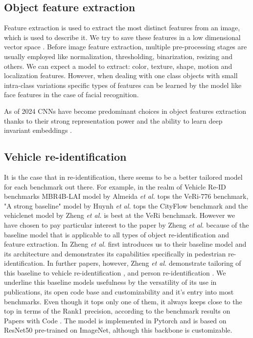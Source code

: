 \documentclass[conference]{IEEEtran} %
\begin{document}
	\subsection{Object feature extraction}
	
		Feature extraction is used to extract the most distinct features from an image, which is used to describe it. We try to save these features in a low dimensional vector space \cite{salau2019feature}. Before image feature extraction, multiple pre-processing stages are usually employed like normalization, thresholding, binarization, resizing and others. We can expect a model to extract: color, texture, shape, motion and localization features. However, when dealing with one class objects with small intra-class variations specific types of features can be learned by the model like face features in the case of facial recognition.
		
		As of 2024 CNNs have become predominant choices in object features extraction thanks to their strong representation power and the ability to learn deep invariant embeddings \cite{zheng2019joint}.
	
	\subsection{Vehicle re-identification}
	
		It is the case that in re-identification, there seems to be a better tailored model for each benchmark out there. For example, in the realm of Vehicle Re-ID benchmarks MBR4B-LAI model by Almeida \textit{et al.} \cite{almeida2023strength} tops the VeRi-776 benchmark, "A strong baseline" model by Huynh \textit{et al.} \cite{huynh2021strong} tops the CityFlow benchmark and the vehiclenet model by Zheng \textit{et al.} \cite{zheng2019vehiclenet} is best at the VeRi benchmark. However we have chosen to pay particular interest to the paper by Zheng \textit{et al.} because of the baseline model that is applicable to all types of object re-identification and feature extraction. In \cite{zheng2017discriminatively} Zheng \textit{et al.} first introduces us to their baseline model and its architecture and demonstrates its capabilities specifically in pedestrian re-identification. In further papers, however, Zheng \textit{et al.} demonstrate tailoring of this baseline to vehicle re-identification \cite{zheng2019vehiclenet}, \cite{zheng2020vehiclenet} and person re-identification \cite{zheng2019joint}. We underline this baseline models usefulness by the versatility of its use in publications, its open code base and customizability and it's entry into most benchmarks. Even though it tops only one of them, it always keeps close to the top in terms of the Rank1 precision, according to the benchmark results on Papers with Code \cite{paperswithcode2024reid}. The model is implemented in Pytorch and is based on ResNet50 pre-trained on ImageNet, although this backbone is customizable.
	
\end{document}

